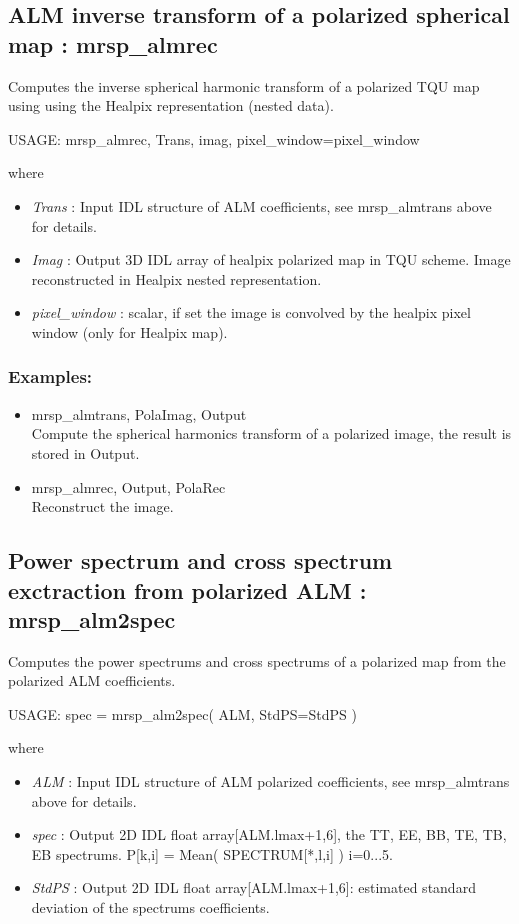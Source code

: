 \subsection{ALM inverse transform of a polarized spherical map : mrsp\_almrec}
Computes the inverse spherical harmonic transform of a polarized TQU map using using the Healpix representation (nested data).
{\bf
\begin{center}
     USAGE: mrsp\_almrec, Trans, imag, pixel\_window=pixel\_window
\end{center}}
where
\begin{itemize}
\item {\em Trans} : Input IDL structure of ALM coefficients, see mrsp\_almtrans above for details.
\item {\em Imag} : Output 3D IDL array of healpix polarized map in TQU scheme. Image reconstructed in Healpix nested representation.
\item {\em pixel\_window} : scalar, if set the image is convolved by the healpix pixel window (only for Healpix map).
\end{itemize}

\subsubsection*{Examples:} 
\begin{itemize}
\item mrsp\_almtrans, PolaImag, Output \\
Compute the spherical harmonics transform of a polarized image, the result is stored in Output.
\item mrsp\_almrec, Output, PolaRec \\
Reconstruct the image.
\end{itemize}



\subsection{Power spectrum and cross spectrum exctraction from polarized ALM : mrsp\_alm2spec}
Computes the power spectrums and cross spectrums of a polarized map from the polarized ALM coefficients.
{\bf
\begin{center}
     USAGE: spec = mrsp\_alm2spec( ALM, StdPS=StdPS )
\end{center}}
where
\begin{itemize}
\item {\em ALM} : Input IDL structure of ALM polarized coefficients, see mrsp\_almtrans above for details.
\item {\em spec} : Output 2D IDL float array[ALM.lmax+1,6], the TT, EE, BB, TE, TB, EB spectrums. P[k,i] = Mean( SPECTRUM[*,l,i] ) \quad i=0...5.
\item {\em StdPS} : Output 2D IDL float array[ALM.lmax+1,6]: estimated standard deviation of the spectrums coefficients.
\end{itemize}

